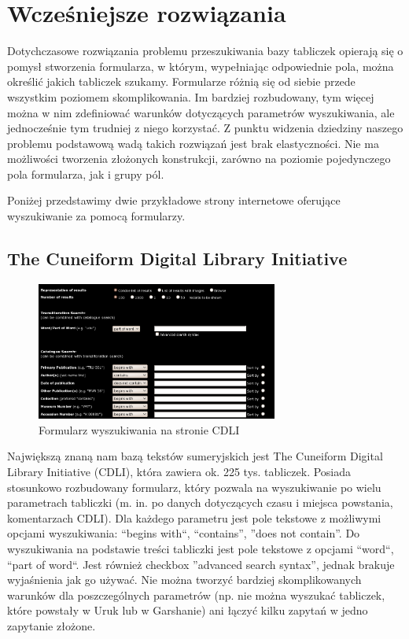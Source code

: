 \section{Wcześniejsze rozwiązania}\label{r:losers}


Dotychczasowe rozwiązania problemu przeszukiwania bazy tabliczek opierają się o pomysł stworzenia formularza,
w którym, wypełniając odpowiednie pola, można określić jakich tabliczek szukamy.
Formularze różnią się od siebie przede wszystkim poziomem skomplikowania.
Im bardziej rozbudowany, tym więcej można w nim zdefiniować warunków dotyczących parametrów wyszukiwania,
ale jednocześnie tym trudniej z niego korzystać.
Z punktu widzenia dziedziny naszego problemu podstawową wadą takich rozwiązań jest 
brak elastyczności. Nie ma możliwości tworzenia złożonych konstrukcji, 
zarówno na poziomie pojedynczego pola formularza, jak i grupy pól.


Poniżej przedstawimy dwie przykładowe strony internetowe oferujące wyszukiwanie za pomocą formularzy.


\subsection{The Cuneiform Digital Library Initiative \cite{cdli}}
\begin{figure}[h]
 \centering
 \includegraphics[width=300px]{../diagramy/cdli-search.png}
 \caption{Formularz wyszukiwania na stronie CDLI}
 \label{fig:cdli-search}
\end{figure}
Największą znaną nam bazą tekstów sumeryjskich jest The Cuneiform Digital Library Initiative (CDLI),
która zawiera ok. 225 tys. tabliczek.
Posiada stosunkowo rozbudowany formularz, 
który pozwala na wyszukiwanie po wielu parametrach tabliczki 
(m. in. po danych dotyczących czasu i miejsca powstania, komentarzach CDLI). 
Dla każdego parametru jest pole tekstowe z możliwymi opcjami wyszukiwania:
``begins with``, ``contains'', ''does not contain''.
Do wyszukiwania na podstawie treści tabliczki jest pole tekstowe z opcjami ``word``, ``part of word``.
Jest również checkbox ''advanced search syntax'', jednak brakuje wyjaśnienia jak go używać.
Nie można tworzyć bardziej skomplikowanych warunków dla poszczególnych parametrów
(np. nie można wyszukać tabliczek, które powstały w Uruk lub w Garshanie)
ani łączyć kilku zapytań w jedno zapytanie złożone.


